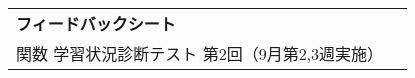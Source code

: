 \begin{table}[h]
    \begin{tabularx}{0.9\linewidth}{ll}
        \textbf{\Large フィードバックシート} & \\
        関数 学習状況診断テスト 第2回（9月第2,3週実施）&
    \end{tabularx}
\end{table}

